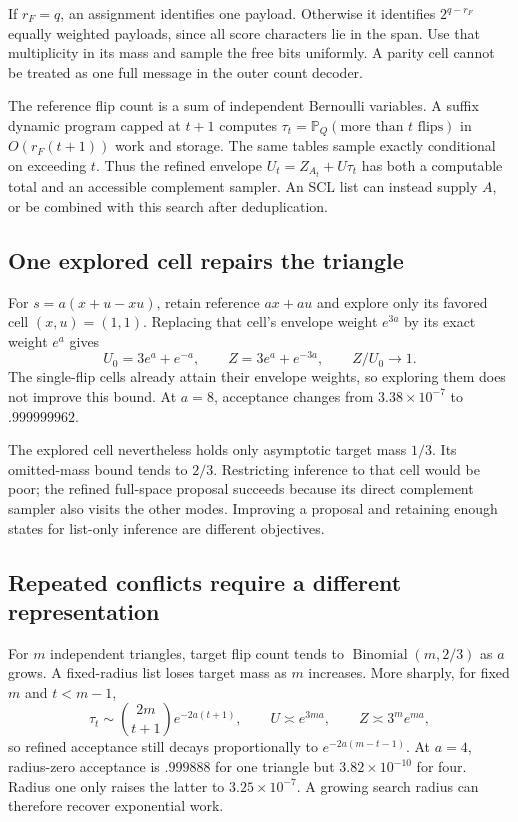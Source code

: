 \documentclass[10pt,a4paper]{article}
\newcommand{\Prb}{\mathbb P}
\begin{document}
If $r_F=q$, an assignment identifies one payload. Otherwise it identifies $2^{q-r_F}$ equally weighted
payloads, since all score characters lie in the span. Use that multiplicity in its mass and sample the
free bits uniformly. A parity cell cannot be treated as one full message in the outer count decoder.

The reference flip count is a sum of independent Bernoulli variables. A suffix dynamic program capped
at $t+1$ computes $\tau_t=\Prb_Q(\text{more than }t\text{ flips})$ in $O(r_F(t+1))$ work and storage.
The same tables sample exactly conditional on exceeding $t$. Thus the refined envelope
$U_t=Z_{A_t}+U\tau_t$ has both a computable total and an accessible complement sampler.
An SCL list can instead supply $A$, or be combined with this search after deduplication.

\subsection{One explored cell repairs the triangle}
For $s=a(x+u-xu)$, retain reference $ax+au$ and explore only its favored cell $(x,u)=(1,1)$.
Replacing that cell's envelope weight $e^{3a}$ by its exact weight $e^a$ gives
\begin{equation}
 U_0=3e^a+e^{-a},\qquad Z=3e^a+e^{-3a},\qquad Z/U_0\longrightarrow1.
 \label{eq:triangle-repair}
\end{equation}
The single-flip cells already attain their envelope weights, so exploring them does not improve this bound.
At $a=8$, acceptance changes from $3.38\times10^{-7}$ to $.999999962$.

The explored cell nevertheless holds only asymptotic target mass $1/3$. Its omitted-mass bound tends
to $2/3$. Restricting inference to that cell would be poor; the refined full-space proposal succeeds
because its direct complement sampler also visits the other modes. Improving a proposal and retaining
enough states for list-only inference are different objectives.

\subsection{Repeated conflicts require a different representation}
For $m$ independent triangles, target flip count tends to $\operatorname{Binomial}(m,2/3)$ as $a$ grows.
A fixed-radius list loses target mass as $m$ increases. More sharply, for fixed $m$ and $t<m-1$,
\[
 \tau_t\sim\binom{2m}{t+1}e^{-2a(t+1)},\qquad U\asymp e^{3ma},\qquad Z\asymp3^me^{ma},
\]
so refined acceptance still decays proportionally to $e^{-2a(m-t-1)}$. At $a=4$, radius-zero acceptance
is $.999888$ for one triangle but $3.82\times10^{-10}$ for four. Radius one only raises the latter to
$3.25\times10^{-7}$. A growing search radius can therefore recover exponential work.
\end{document}
